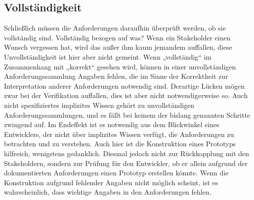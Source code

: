 \subsection{Vollständigkeit}
\label{sec:Kap-6.4.4}

\vspace{-1mm} %

Schließlich müssen die Anforderungen daraufhin überprüft werden, ob sie vollständig sind. Vollständig bezogen auf was? Wenn ein Stakeholder einen Wunsch vergessen hat, wird das außer ihm kaum jemandem auffallen, diese Unvollständigkeit ist hier aber nicht gemeint. Wenn „vollständig“ im Zusammenhang mit „korrekt“ gesehen wird, können in einer unvollständigen Anforderungssammlung Angaben fehlen, die im Sinne der Korrektheit zur Interpretation anderer Anforderungen notwendig sind. Derartige Lücken mögen zwar bei der Verifikation auffallen, dies ist aber nicht notwendigerweise so. Auch nicht spezifiziertes implizites Wissen gehört zu unvollständigen Anforderungssammlungen, und es fällt bei keinem der bislang genannten Schritte zwingend auf. Im Endeffekt ist es notwendig aus dem Blickwinkel eines Entwicklers, der nicht über implizites Wissen verfügt, die Anforderungen zu betrachten und zu verstehen. Auch hier ist die Konstruktion eines Prototyps hilfreich, wenigstens gedanklich. Diesmal jedoch nicht zur Rückkopplung mit den Stakeholdern, sondern zur Prüfung für den Entwickler, ob er allein aufgrund der dokumentierten Anforderungen einen Prototyp erstellen könnte. Wenn die Konstruktion aufgrund fehlender Angaben nicht möglich scheint, ist es wahrscheinlich, dass wichtige Angaben in den Anforderungen fehlen.